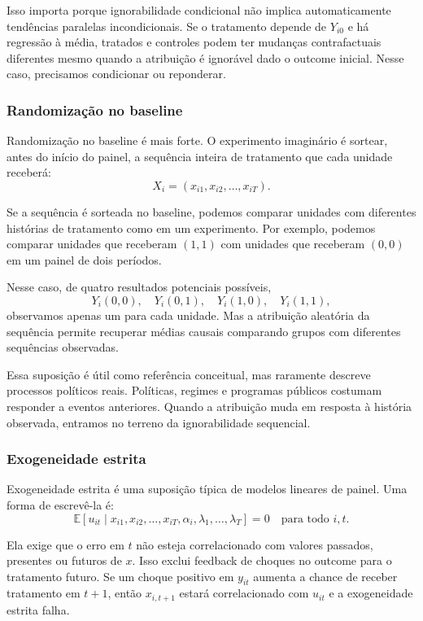 \documentclass[
]{article}
\begin{document}
Isso importa porque ignorabilidade condicional não implica automaticamente tendências paralelas incondicionais. Se o tratamento depende de \(Y_{i0}\) e há regressão à média, tratados e controles podem ter mudanças contrafactuais diferentes mesmo quando a atribuição é ignorável dado o outcome inicial. Nesse caso, precisamos condicionar ou reponderar.

\subsubsection{Randomização no baseline}\label{randomizauxe7uxe3o-no-baseline}

Randomização no baseline é mais forte. O experimento imaginário é sortear, antes do início do painel, a sequência inteira de tratamento que cada unidade receberá:
\[
X_i = (x_{i1}, x_{i2}, \ldots, x_{iT}).
\]

Se a sequência é sorteada no baseline, podemos comparar unidades com diferentes histórias de tratamento como em um experimento. Por exemplo, podemos comparar unidades que receberam \((1,1)\) com unidades que receberam \((0,0)\) em um painel de dois períodos.

Nesse caso, de quatro resultados potenciais possíveis,
\[
Y_i(0,0), \quad Y_i(0,1), \quad Y_i(1,0), \quad Y_i(1,1),
\]
observamos apenas um para cada unidade. Mas a atribuição aleatória da sequência permite recuperar médias causais comparando grupos com diferentes sequências observadas.

Essa suposição é útil como referência conceitual, mas raramente descreve processos políticos reais. Políticas, regimes e programas públicos costumam responder a eventos anteriores. Quando a atribuição muda em resposta à história observada, entramos no terreno da ignorabilidade sequencial.

\subsubsection{Exogeneidade estrita}\label{exogeneidade-estrita}

Exogeneidade estrita é uma suposição típica de modelos lineares de painel. Uma forma de escrevê-la é:
\[
\mathbb{E}[u_{it} \mid x_{i1}, x_{i2}, \ldots, x_{iT}, \alpha_i, \lambda_1, \ldots, \lambda_T] = 0
\quad \text{para todo } i,t.
\]

Ela exige que o erro em \(t\) não esteja correlacionado com valores passados, presentes ou futuros de \(x\). Isso exclui feedback de choques no outcome para o tratamento futuro. Se um choque positivo em \(y_{it}\) aumenta a chance de receber tratamento em \(t+1\), então \(x_{i,t+1}\) estará correlacionado com \(u_{it}\) e a exogeneidade estrita falha.
\end{document}
